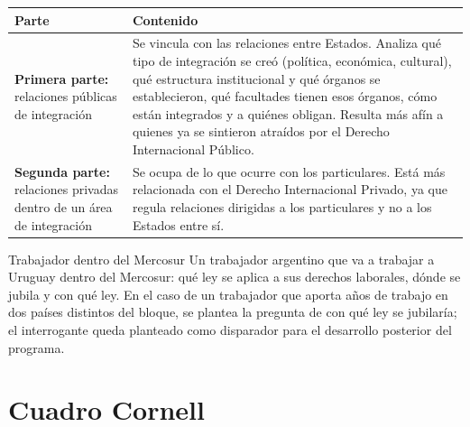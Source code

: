 \documentclass[12pt,oneside]{book}
\begin{document}
\begin{table}[H]
\centering
\small
\renewcommand{\arraystretch}{1.3}
\begin{tabularx}{\textwidth}{
    >{\raggedright\arraybackslash}p{}
    >{\raggedright\arraybackslash}X
}
\toprule
\textbf{Parte} & \textbf{Contenido} \\
\midrule
\textbf{Primera parte:} relaciones públicas de integración &
Se vincula con las relaciones entre Estados. Analiza qué tipo de integración se creó (política, económica, cultural), qué estructura institucional y qué órganos se establecieron, qué facultades tienen esos órganos, cómo están integrados y a quiénes obligan. Resulta más afín a quienes ya se sintieron atraídos por el Derecho Internacional Público. \\
\addlinespace
\textbf{Segunda parte:} relaciones privadas dentro de un área de integración &
Se ocupa de lo que ocurre con los particulares. Está más relacionada con el Derecho Internacional Privado, ya que regula relaciones dirigidas a los particulares y no a los Estados entre sí. \\
\bottomrule
\end{tabularx}
\end{table}

\begin{example}{Trabajador dentro del Mercosur}
Un trabajador argentino que va a trabajar a Uruguay dentro del Mercosur: qué ley se aplica a sus derechos laborales, dónde se jubila y con qué ley. En el caso de un trabajador que aporta años de trabajo en dos países distintos del bloque, se plantea la pregunta de con qué ley se jubilaría; el interrogante queda planteado como disparador para el desarrollo posterior del programa.
\end{example}

\section{Cuadro Cornell}
\end{document}
